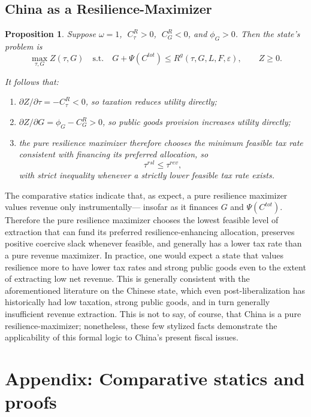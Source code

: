 \documentclass[12pt]{article}
\newtheorem{proposition}{Proposition}
\begin{document}
\subsection{China as a Resilience-Maximizer}

\begin{proposition}\label{prop:pure_resilience}
Suppose $\omega=1$, $\;C^R_\tau>0$, $\;C^R_G<0$, and $\phi_G>0$. Then the state's problem is
\[
\max_{\tau,G} Z(\tau,G)
\quad \text{s.t.} \quad
G+\Psi(C^{tot}) \le R^g(\tau,G,L,F,\varepsilon), \qquad Z\ge 0.
\]

It follows that:
\begin{enumerate}
    \item $\partial Z/\partial \tau = -C^R_\tau <0$, so taxation reduces utility directly;
    
    \item $\partial Z/\partial G = \phi_G - C^R_G >0$, so public goods provision increases utility directly;
    
    \item the pure resilience maximizer therefore chooses the minimum feasible tax rate consistent with financing its preferred allocation, so
    \[
    \tau^{rsl} \le \tau^{rev},
    \]
    with strict inequality whenever a strictly lower feasible tax rate exists.
\end{enumerate}
\end{proposition}

The comparative statics indicate that, as expect, a pure resilience maximizer values revenue only instrumentally--- insofar as it finances $G$ and $\Psi(C^{tot})$. Therefore the pure resilience maximizer chooses the lowest feasible level of extraction that can fund its preferred resilience-enhancing allocation, preserves positive coercive slack whenever feasible, and generally has a lower tax rate than a pure revenue maximizer. In practice, one would expect a state that values resilience more to have lower tax rates and strong public goods even to the extent of extracting low net revenue. This is generally consistent with the aforementioned literature on the Chinese state, which even post-liberalization has historically had low taxation, strong public goods, and in turn generally insufficient revenue extraction. This is not to say, of course, that China is a pure resilience-maximizer; nonetheless, these few stylized facts demonstrate the applicability of this formal logic to China's present fiscal issues.

\section*{Appendix: Comparative statics and proofs}
\end{document}
